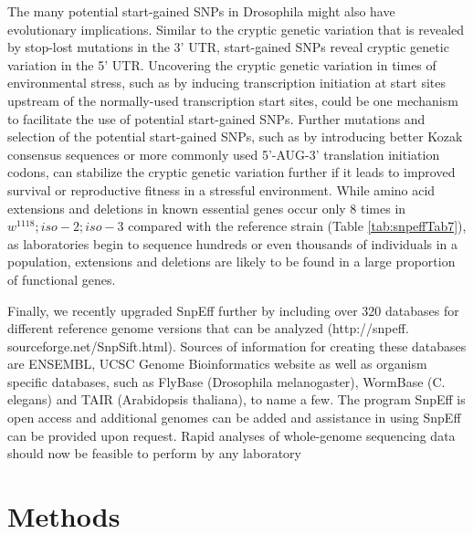 The many potential start-gained SNPs in Drosophila might also have evolutionary implications. Similar to the cryptic genetic variation that is revealed by stop-lost mutations in the 3' UTR, start-gained SNPs reveal cryptic genetic variation in the 5' UTR. Uncovering the cryptic genetic variation in times of environmental stress, such as by inducing transcription initiation at start sites upstream of the normally-used transcription start sites, could be one mechanism to facilitate the use of potential start-gained SNPs. Further mutations and selection of the potential start-gained SNPs, such as by introducing better Kozak consensus sequences or more commonly used 5'-AUG-3' translation initiation codons, can stabilize the cryptic genetic variation further if it leads to improved survival or reproductive fitness in a stressful environment. While amino acid extensions and deletions in known essential genes occur only 8 times in $w^{1118} ; iso-2; iso-3$ compared with the reference strain (Table \ref{tab:snpeffTab7}), as laboratories begin to sequence hundreds or even thousands of individuals in a population, extensions and deletions are likely to be found in a large proportion of functional genes.


Finally, we recently upgraded SnpEff further by including over 320 databases for different reference genome versions that can be analyzed (http://snpeff.  sourceforge.net/SnpSift.html). Sources of information for creating these databases are ENSEMBL, UCSC Genome Bioinformatics website as well as organism specific databases, such as FlyBase (Drosophila melanogaster), WormBase (C.  elegans) and TAIR (Arabidopsis thaliana), to name a few. The program SnpEff is open access and additional genomes can be added and assistance in using SnpEff can be provided upon request. Rapid analyses of whole-genome sequencing data should now be feasible to perform by any laboratory

\section{Methods \label{sec:snpeffMethods}}

